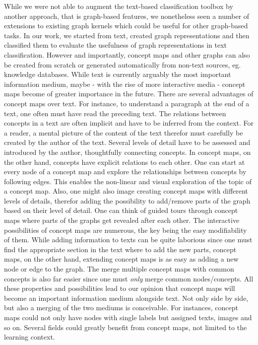 While we were not able to augment the text-based classification toolbox by another approach, that is graph-based features, we nonetheless seen a number of extensions to existing graph kernels which could be useful for other graph-based tasks.
In our work, we started from text, created graph representations and then classified them to evaluate the usefulness of graph representations in text classification.
However and importantly, concept maps and other graphs can also be created from scratch or generated automatically from non-text sources, eg. knowledge databases.
While text is currently arguably the most important information medium, maybe - with the rise of more interactive media - concept maps become of greater importance in the future.
There are several advantages of concept maps over text.
For instance, to understand a paragraph at the end of a text, one often must have read the preceding text.
The relations between concepts in a text are often implicit and have to be inferred from the context.
For a reader, a mental picture of the content of the text therefor must carefully be created by the author of the text.
Several levels of detail have to be assessed and introduced by the author, thoughtfully connecting concepts.
In concept maps, on the other hand, concepts have explicit relations to each other.
One can start at every node of a concept map and explore the relationships between concepts by following edges.
This enables the non-linear and visual exploration of the topic of a concept map.
Also, one might also image creating concept maps with different levels of details, therefor adding the possibility to add/remove parts of the graph based on their level of detail.
One can think of guided tours through concept maps where parts of the graphs get revealed after each other.
The interactive possibilities of concept maps are numerous, the key being the easy modifiability of them.
While adding information to texts can be quite laborious since one must find the appropriate section in the text where to add the new parts, concept maps, on the other hand, extending concept maps is as easy as adding a new node or edge to the graph.
The merge multiple concept maps with common concepts is also far easier since one must \textit{only} merge common nodes/concepts.
All these properties and possibilities lead to our opinion that concept maps will become an important information medium alongside text.
Not only side by side, but also a merging of the two mediums is conceivable.
For instances, concept maps could not only have nodes with single labels but assigned texts, images and so on.
Several fields could greatly benefit from concept maps, not limited to the learning context.

